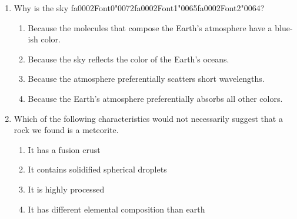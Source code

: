 \documentclass[12pt]{article}
\begin{document}
\begin{enumerate}[label=\arabic*.]
\begin{enumerate}[label=(\alph*)]
\end{enumerate}
\item Why is the sky {\csname fa0002Font0\endcsname\char"0072}{\csname fa0002Font1\endcsname\char"0065}{\csname fa0002Font2\endcsname\char"0064}?
\begin{enumerate}[label=(\alph*)]
    \item Because the molecules that compose the Earth's atmosphere have a blue-ish color.
    \item Because the sky reflects the color of the Earth's oceans.
    \item Because the atmosphere preferentially scatters short wavelengths.
    \item Because the Earth's atmosphere preferentially absorbs all other colors.
\end{enumerate}
\item Which of the following characteristics would not necessarily suggest that a rock we found
is a meteorite.
\begin{enumerate}[label=(\alph*)]
    \item It has a fusion crust
    \item It contains solidified spherical droplets
    \item It is highly processed
    \item It has different elemental composition than earth
\end{enumerate}
\end{enumerate}
\end{document}

